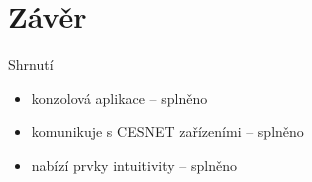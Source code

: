 \documentclass[czech,aspectratio=169]{beamer}
\begin{document}

\section{Závěr}
\begin{frame}{Shrnutí}
    \begin{itemize}
        \pause{}
        \item konzolová aplikace\pause{} -- splněno
        \pause{}
        \item komunikuje s CESNET zařízeními\pause{} -- splněno
        \pause{}
        \item nabízí prvky intuitivity\pause{} -- splněno
    \end{itemize}
\end{frame}
\end{document}
